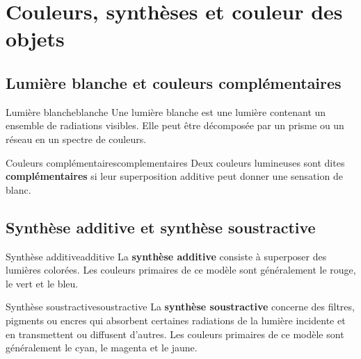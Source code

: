 \documentclass[11pt,a4paper]{article}
\begin{document}
\section{Couleurs, synthèses et couleur des objets}

\subsection{Lumière blanche et couleurs complémentaires}

\begin{definitionbox}{Lumière blanche}{blanche}
Une lumière blanche est une lumière contenant un ensemble de radiations visibles. Elle peut être décomposée par un prisme ou un réseau en un spectre de couleurs.
\end{definitionbox}

\begin{definitionbox}{Couleurs complémentaires}{complementaires}
Deux couleurs lumineuses sont dites \textbf{complémentaires} si leur superposition additive peut donner une sensation de blanc.
\end{definitionbox}

\begin{center}
\end{center}

\subsection{Synthèse additive et synthèse soustractive}

\begin{definitionbox}{Synthèse additive}{additive}
La \textbf{synthèse additive} consiste à superposer des lumières colorées. Les couleurs primaires de ce modèle sont généralement le rouge, le vert et le bleu.
\end{definitionbox}

\begin{definitionbox}{Synthèse soustractive}{soustractive}
La \textbf{synthèse soustractive} concerne des filtres, pigments ou encres qui absorbent certaines radiations de la lumière incidente et en transmettent ou diffusent d'autres. Les couleurs primaires de ce modèle sont généralement le cyan, le magenta et le jaune.
\end{definitionbox}
\end{document}
